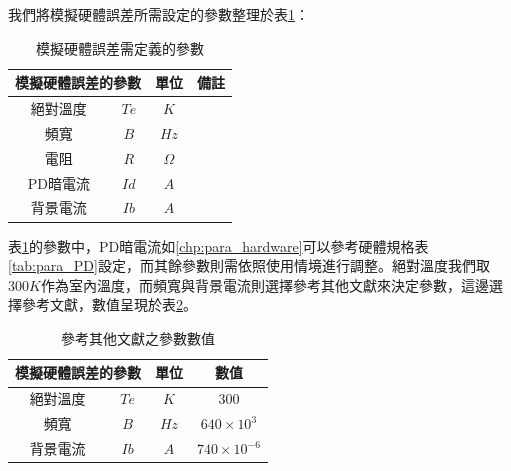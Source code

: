    我們將模擬硬體誤差所需設定的參數整理於表\ref{tab:para_error}：

    \begin{table}[htpb]
        \renewcommand{\arraystretch}{1.3}
        \setlength{\arrayrulewidth}{0.15mm}
        \setlength{\doublerulesep}{0.12mm}
        \caption{模擬硬體誤差需定義的參數}
        \label{tab:para_error}
        \centering
        \begin{tabular}{|cc|c|c|}
        \hline
        \multicolumn{2}{|c|}{\textbf{模擬硬體誤差的參數}}  &\textbf{單位}  &  \textbf{備註}   \\
        \hline
        絕對溫度 &$Te$ & $K$ &  \\
        頻寬 &$B$ & $Hz$ &  \\
        電阻 &$R$ & $\Omega$ &  \\
        PD暗電流 &$Id$ & $A$ &  \\
        背景電流 &$Ib$ & $A$ &  \\
        \hline
        \end{tabular}
    \end{table}


    表\ref{tab:para_error}的參數中，PD暗電流如\ref{chp:para_hardware}可以參考硬體規格表\ref{tab:para_PD}設定，而其餘參數則需依照使用情境進行調整。絕對溫度我們取$300K$作為室內溫度，而頻寬與背景電流則選擇參考其他文獻來決定參數，這邊選擇參考文獻\cite{omg_old}，數值呈現於表\ref{tab:para_from_cite}。


    \begin{table}[h!]
        \renewcommand{\arraystretch}{1.3}
        \setlength{\arrayrulewidth}{0.15mm}
        \setlength{\doublerulesep}{0.12mm}
        \caption{參考其他文獻之參數數值}
        \label{tab:para_from_cite}
        \centering
        \begin{tabular}{|cc|c|c|}
        \hline
        \multicolumn{2}{|c|}{\textbf{模擬硬體誤差的參數}}  &\textbf{單位}  &  \textbf{數值}   \\
        \hline
        絕對溫度 &$Te$ & $K$ &  $300$\cite{omg_old} \\
        頻寬 &$B$ & $Hz$ &  $640\times 10^{3}$ \cite{omg_old}\\
        背景電流 &$Ib$ & $A$ &  $740\times 10^{-6}$ \cite{omg_old}\\
        \hline
        \end{tabular}
    \end{table}










